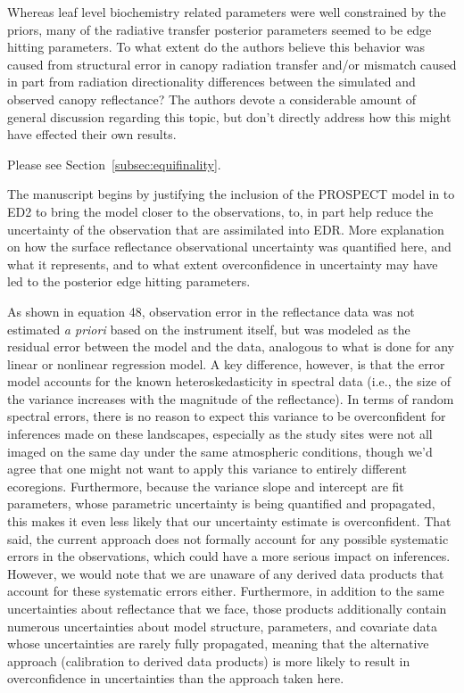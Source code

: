 \begin{reviewer}
  Whereas leaf level biochemistry related parameters were well constrained by the priors, many of the radiative transfer posterior parameters seemed to be edge hitting parameters.
  To what extent do the authors believe this behavior was caused from structural error in canopy radiation transfer and/or mismatch caused in part from radiation directionality differences between the simulated and observed canopy reflectance?
  The authors devote a considerable amount of general discussion regarding this topic, but don’t directly address how this might have effected their own results.
\end{reviewer}

Please see Section~\ref{subsec:equifinality}.

\begin{reviewer}
  The manuscript begins by justifying the inclusion of the PROSPECT model in to ED2 to bring the model closer to the observations, to, in part help reduce the uncertainty of the observation that are assimilated into EDR.\@
  More explanation on how the surface reflectance observational uncertainty was quantified here, and what it represents, and to what extent overconfidence in uncertainty may have led to the posterior edge hitting parameters.
\end{reviewer}

As shown in equation 48, observation error in the reflectance data was not estimated \emph{a priori} based on the instrument itself, but was modeled as the residual error between the model and the data, analogous to what is done for any linear or nonlinear regression model.
A key difference, however, is that the error model accounts for the known heteroskedasticity in spectral data (i.e., the size of the variance increases with the magnitude of the reflectance).
In terms of random spectral errors, there is no reason to expect this variance to be overconfident for inferences made on these landscapes, especially as the study sites were not all imaged on the same day under the same atmospheric conditions, though we’d agree that one might not want to apply this variance to entirely different ecoregions.
Furthermore, because the variance slope and intercept are fit parameters, whose parametric uncertainty is being quantified and propagated, this makes it even less likely that our uncertainty estimate is overconfident.
That said, the current approach does not formally account for any possible systematic errors in the observations, which could have a more serious impact on inferences.
However, we would note that we are unaware of any derived data products that account for these systematic errors either.
Furthermore, in addition to the same uncertainties about reflectance that we face, those products additionally contain numerous uncertainties about model structure, parameters, and covariate data whose uncertainties are rarely fully propagated, meaning that the alternative approach (calibration to derived data products) is more likely to result in overconfidence in uncertainties than the approach taken here.

